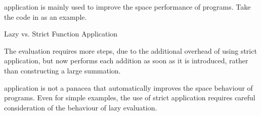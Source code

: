  application is mainly used to improve the space performance of programs.
Take the code in  as an example.

\begin{listing}[h!tbp]
\caption{Lazy vs. Strict Function Application}
\label{lst:Lazy_vs_Strict_Function_Application}
\end{listing}

The  evaluation requires more steps, due to the additional overhead of using strict application, but now performs each addition as soon as it is introduced, rather than constructing a large summation.

 application is not a panacea that automatically improves the space behaviour of programs.
Even for simple examples, the use of strict application requires careful consideration of the behaviour of lazy evaluation.

